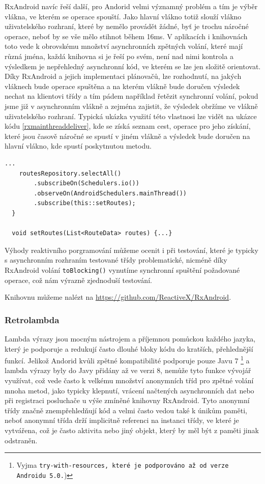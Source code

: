\documentclass{article}
\begin{document}
RxAndroid navíc řeší další, pro Andorid velmi významný problém a tím je výběr vlákna, ve kterém se
operace spouští. Jako hlavní vlákno totiž slouží vlákno uživatelského rozhraní, které by
nemělo provádět žádné, byť je trochu náročné operace, neboť by se vše mělo stihnot během 16ms.\cite{perf}
V aplikacích i knihovnách toto vede k obrovskému množství asynchronních zpětných volání, které mají různá jména,
každá knihovna si je řeší po svém, není nad nimi kontrola a výsledkem je nepřehledný asynchronní kód,
ve kterém se lze jen složitě orientovat. Díky RxAndroid a jejich implementaci plánovačů, lze rozhodnutí,
na jakých vláknech bude operace spuštěna a na kterém vlákně bude doručen výsledek nechat na klientovi třídy
a tím pádem například řetězit synchronní volání, pokud jsme již v asynchronním vlákně a zejména zajistit,
že výsledek obržíme ve vlákně uživatelského rozhraní. Typická ukázka využití této vlastnosi
lze vidět na ukázce kódu \ref{rxmainthreaddeliver}, kde se získá seznam cest, operace pro jeho získání,
které jsou časově náročné se spustí v jiném vlákně a výsledek bude doručen na hlavní vlákno,
kde spustí poskytnutou metodu.


\begin{lstlisting}[label=rxmainthreaddeliver,caption=Reakce na událost v UI vlákně pomocí RxAndorid]
    ...
    routesRepository.selectAll()
        .subscribeOn(Schedulers.io())
        .observeOn(AndroidSchedulers.mainThread())
        .subscribe(this::setRoutes);
  }

  void setRoutes(List<RouteData> routes) {...}
\end{lstlisting}

Výhody reaktivního porgramování můžeme ocenit i při testování, které je typicky s asynchronním
rozhraním testované třídy problematické, nicméně díky RxAndroid volání \texttt{toBlocking()} vynutíme
synchronní spuštění požadované operace, což nám výrazně zjednoduší testování.

Knihovnu můžeme nalézt na \url{https://github.com/ReactiveX/RxAndroid}.

\subsubsection{Retrolambda}
Lambda výrazy jsou mocným nástrojem a příjemnou pomůckou každého jazyka, který je podporuje a redukují
často dlouhé bloky kódu do kratších, přehlednější funkcí. Jelikož Andorid kvůli zpětné
kompatibilité podporuje pouze Javu 7
\footnote{Vyjma \texttt{try-with-resources, které je podporováno až od verze Androidu 5.0.})}
a lambda výrazy byly do Javy přidány až ve verzi 8, nemůže tyto funkce vývojář využívat,
což vede často k velkému množství anonymních tříd pro zpětné volání mnoha metod, jako typicky klepnutí,
vrácení načtených asynchronních dat nebo při registraci posluchače u výše zmíněné knihovny RxAndroid.
Tyto anonymní třídy značně znempřehledňují kód a velmi často vedou také k únikům paměti,
neboť anonymní třída drží implicitně referenci na instanci třídy, ve které je vytvářena, což je často
aktivita nebo jiný objekt, který by měl být z paměti jinak odstraněn.
\end{document}
